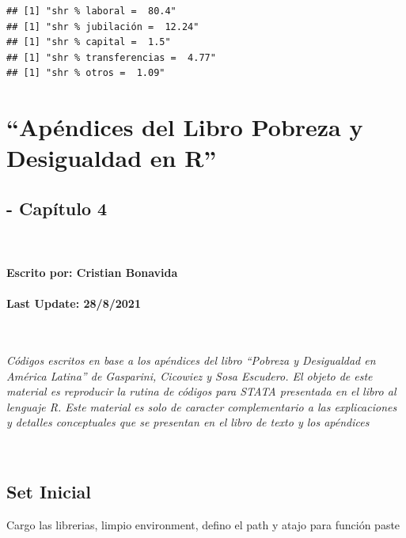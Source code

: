 \documentclass[
]{book}
\begin{document}
\begin{verbatim}
## [1] "shr % laboral =  80.4"
## [1] "shr % jubilación =  12.24"
## [1] "shr % capital =  1.5"
## [1] "shr % transferencias =  4.77"
## [1] "shr % otros =  1.09"
\end{verbatim}

\hypertarget{apuxe9ndices-del-libro-pobreza-y-desigualdad-en-r-1}{%
\chapter{``Apéndices del Libro Pobreza y Desigualdad en R''}\label{apuxe9ndices-del-libro-pobreza-y-desigualdad-en-r-1}}

\hypertarget{capuxedtulo-4}{%
\section{- Capítulo 4}\label{capuxedtulo-4}}

~

\hypertarget{escrito-por-cristian-bonavida-1}{%
\subsubsection*{Escrito por: Cristian Bonavida}\label{escrito-por-cristian-bonavida-1}}

\hypertarget{last-update-2882021}{%
\subsubsection*{Last Update: 28/8/2021}\label{last-update-2882021}}

~

\emph{Códigos escritos en base a los apéndices del libro ``Pobreza y Desigualdad en América Latina'' de Gasparini, Cicowiez y Sosa Escudero. El objeto de este material es reproducir la rutina de códigos para STATA presentada en el libro al lenguaje R. Este material es solo de caracter complementario a las explicaciones y detalles conceptuales que se presentan en el libro de texto y los apéndices}

~

\hypertarget{set-inicial-1}{%
\section{Set Inicial}\label{set-inicial-1}}

Cargo las librerias, limpio environment, defino el path y atajo para función paste
\end{document}

